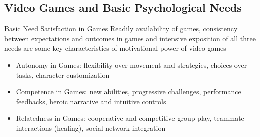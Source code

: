 \documentclass{beamer}
\newcommand\includegraphicscopyright[3][]{%
  \leavevmode\vbox{\vskip10pt\raggedright\setbox\mytempbox=\hbox{\texttt{[image: \#2]}}%
    \mytempdimen=\wd\mytempbox\box\mytempbox\par\vskip1pt%
    \fontsize{3.5}{4}\selectfont{\color{black!25}{\vbox{\hsize=\mytempdimen#3}}}\vskip3pt%
}}
\begin{document}
\subsection{Video Games and Basic Psychological Needs}
\begin{frame}{Basic Need Satisfaction in Games}
Readily availability of games, consistency between expectations and outcomes in games and intensive exposition of all three needs are some key characteristics of motivational power of video games \cite{RyanRigby2011glued}
\begin{itemize}
\item \alert{Autonomy in Games}:  flexibility over movement and strategies, choices over tasks, character customization
  \item \alert{Competence in Games}: new abilities, progressive challenges, performance feedbacks, heroic narrative and intuitive controls
  \item \alert{Relatedness in Games}: cooperative and competitive group play, teammate interactions (healing), social network integration 
   \end{itemize}
\end{frame}

\end{document}
